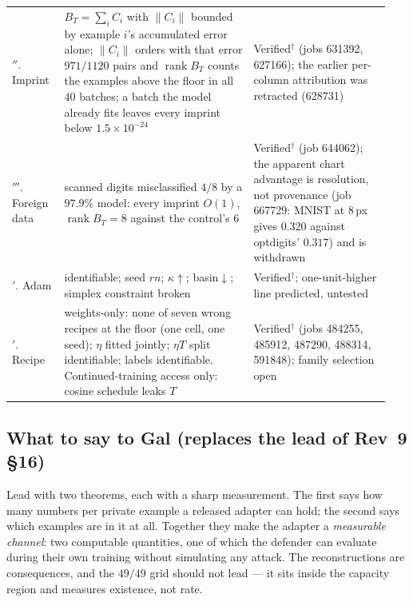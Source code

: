 \begin{center}
\begin{tabular}{@{}>{\raggedright\arraybackslash}p{0.13\linewidth}>{\raggedright\arraybackslash}p{0.47\linewidth}>{\raggedright\arraybackslash}p{0.34\linewidth}@{}}
6$''$. Imprint & $B_T=\sum_iC_i$ with $\|C_i\|$ bounded by example $i$'s accumulated error alone; $\|C_i\|$ orders with that error $971/1120$ pairs and $\operatorname{rank}B_T$ counts the examples above the floor in all $40$ batches; a batch the model already fits leaves every imprint below $1.5\times10^{-24}$ & Verified$^\dagger$ (jobs 631392, 627166); the earlier per-column attribution was retracted (628731)\\
6$'''$. Foreign data & scanned digits misclassified $4/8$ by a $97.9\%$ model: every imprint $O(1)$, $\operatorname{rank}B_T=8$ against the control's $6$ & Verified$^\dagger$ (job 644062); the apparent chart advantage is resolution, not provenance (job 667729: MNIST at $8$\,px gives $0.320$ against optdigits' $0.317$) and is withdrawn\\
7$'$. Adam & identifiable; seed $rn$; $\kappa\uparrow$; basin$\downarrow$; simplex constraint broken & Verified$^\dagger$; one-unit-higher line predicted, untested\\
8$'$. Recipe & weights-only: none of seven wrong recipes at the floor (one cell, one seed); $\eta$ fitted jointly; $\eta T$ split identifiable; labels identifiable. Continued-training access only: cosine schedule leaks $T$ & Verified$^\dagger$ (jobs 484255, 485912, 487290, 488314, 591848); family selection open\\ \bottomrule
\end{tabular}
\end{center}

\subsection{What to say to Gal (replaces the lead of Rev~9 \S16)}
\label{sec:gal}

Lead with two theorems, each with a sharp measurement. The first says how
many numbers per private example a released adapter can hold; the second
says which examples are in it at all. Together they make the adapter a
\emph{measurable channel}: two computable quantities, one of which the
defender can evaluate during their own training without simulating any
attack. The reconstructions are consequences, and the $49/49$ grid should
not lead — it sits inside the capacity region and measures existence, not
rate.


